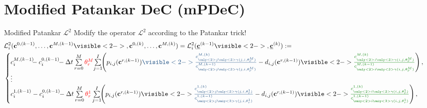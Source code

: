 \documentclass[9pt,compress,t,aspectratio=169]{beamer}
\newcommand{\1}{\begin{pmatrix}
                 1\\
                 1
                \end{pmatrix}}
\def\L{\mathcal{L}}
\def\bbc{\underline{\mathbf{c}}}
\def\bc{\mathbf{c}}
\begin{document}
\section{Modified Patankar DeC (mPDeC)}
\begin{frame}{Modified Patankar $\L^2$}
Modify the operator $\L^2$ according to the Patankar trick!
\begin{equation*}\label{eq:L2m}
\!\!\begin{split}
&\L_i^2(\bc^{0,(k-1)}, \dots, \bc^{M,(k-1)}\visible<2->{,\bc^{0,(k)}, \dots, \bc^{M,(k)}}) =\L_i^2(\bbc^{(k-1)}\visible<2->{,\bbc^{(k)}}):=\\
&\begin{cases}
c_i^{M,(k-1)} \!\!\!-c_i^{0,(k-1)}\!\! -\Delta t \sum\limits_{r=0}^M {\color{red}\theta_r^M}  \! \sum\limits_{j=1}^I \!\! \left(   p_{i,j}(\bc^{r,(k-1)}) {\color{lightblue}\visible<2->{\frac{c^{M,(k)}_{\only<2>{j}\only<3>{\gamma(j,i, \theta_r^M)}}}{c_{\only<2>{j}\only<3>{\gamma(j,i, \theta_r^M)}}^{M,(k-1)}}}} -  d_{i,j}(\bc^{r,(k-1)})  \visible<2->{{\color{lightgreen}\frac{c^{M,(k)}_{\only<2>{i}\only<3>{\gamma(i,j, \theta_r^M)}}}{c_{\only<2>{i}\only<3>{\gamma(i,j, \theta_r^M)}}^{M,(k-1)}}}} \right),\\
\vdots\\
c_i^{1,(k-1)}-c_i^{0,(k-1)} \!\!- \Delta t  \sum\limits_{r=0}^M {\color{red}\theta_r^1} \sum\limits_{j=1}^I \!\!
\left(  p_{i,j}(\bc^{r,(k-1)}) \visible<2->{{\color{lightblue}\frac{c^{1,(k)}_{\only<2>{j}\only<3>{\gamma(j,i, \theta_r^1)}}}{c_{\only<2>{j}\only<3>{\gamma(j,i, \theta_r^1)}}^{1,(k-1)}}}} -  d_{i,j}(\bc^{r,(k-1)})  \visible<2->{{\color{lightgreen}\frac{c^{1,(k)}_{\only<2>{i}\only<3>{\gamma(i,j, \theta_r^1)}}}{c_{\only<2>{i}\only<3>{\gamma(i,j, \theta_r^1)}}^{1,(k-1)}}}} \right),
\end{cases}
\end{split}
\end{equation*}
\end{frame}
\end{document}
